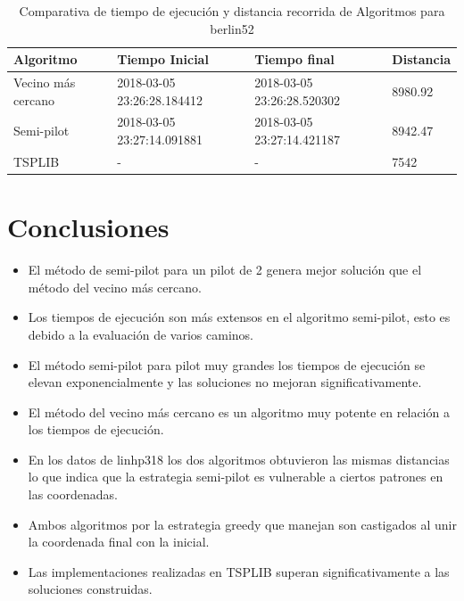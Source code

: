 \documentclass{article}
\begin{document}
\begin{table}[H]
\centering
\caption{Comparativa de tiempo de ejecución y distancia recorrida de Algoritmos para berlin52}
\label{Table:berlin52}
\begin{tabular}{| l | l | l | l |}
\hline
Algoritmo & Tiempo Inicial & Tiempo final & Distancia \\ \hline
Vecino más cercano & 2018-03-05 23:26:28.184412 & 2018-03-05 23:26:28.520302 & 8980.92 \\ \hline
Semi-pilot & 2018-03-05 23:27:14.091881 & 2018-03-05 23:27:14.421187 & 8942.47 \\ \hline
TSPLIB & - & - & 7542 \\ \hline

\end{tabular}
\end{table}

\section{Conclusiones}
\begin{itemize}
\item El método de semi-pilot para un pilot de 2 genera mejor solución que el método del vecino más cercano.
\item Los tiempos de ejecución son más extensos en el algoritmo semi-pilot, esto es debido a la evaluación de varios caminos.
\item El método semi-pilot para pilot muy grandes los tiempos de ejecución se elevan exponencialmente y las soluciones no mejoran significativamente.
\item El método del vecino más cercano es un algoritmo muy potente en relación a los tiempos de ejecución.
\item En los datos de linhp318 los dos algoritmos obtuvieron las mismas distancias lo que indica que la estrategia semi-pilot es vulnerable a ciertos patrones en las coordenadas.
\item Ambos algoritmos por la estrategia greedy que manejan son castigados al unir la coordenada final con la inicial.
\item Las implementaciones realizadas en TSPLIB superan significativamente a las soluciones construidas.
\end{itemize}
\end{document}
